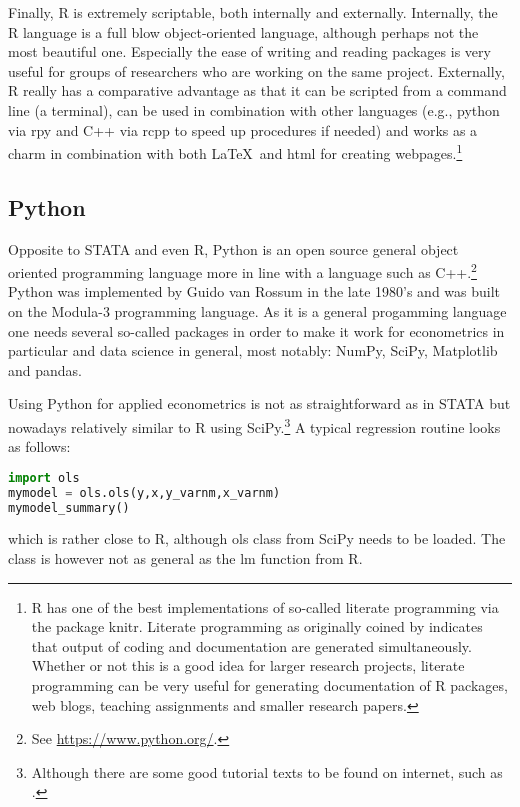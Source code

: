 \documentclass[fleqn,10pt]{SelfArx} %
\begin{document}
Finally, R is extremely scriptable, both internally and externally. Internally, the R language is a full blow object-oriented language, although perhaps not the most beautiful one. Especially the ease of writing and reading packages is very useful for groups of researchers who are working on the same project. Externally, R really has a comparative advantage as that it can be scripted from a command line (a terminal), can be used in combination with other languages (e.g., python via rpy and C++ via rcpp to speed up procedures if needed) and works as a charm in combination with both \LaTeX\ and html for creating webpages.\footnote{R has one of the best implementations of so-called literate programming via the package knitr. Literate programming as originally coined by \citet{knuth1984literate} indicates that output of coding and documentation are generated simultaneously. Whether or not this is a good idea for larger research projects, literate programming can be very useful for generating documentation of R packages, web blogs, teaching assignments and smaller research papers.}

\subsection*{Python}

Opposite to STATA and even R, Python is an open source general object oriented programming language more in line with a language such as C++.\footnote{See \href{https://www.python.org/}{https://www.python.org/}.} Python was implemented by Guido van Rossum in the late 1980's and was built on the Modula-3 programming language. As it is a general progamming language one needs several so-called packages in order to make it work for econometrics in particular and data science in general, most notably: NumPy, SciPy, Matplotlib and pandas.

Using Python for applied econometrics is not as straightforward as in STATA but nowadays relatively similar to R using SciPy.\footnote{Although there are some good tutorial texts to be found on internet, such as \citet{sargent2015quantitative}.} A typical regression routine looks as follows:
\begin{lstlisting}[language=python]
import ols
mymodel = ols.ols(y,x,y_varnm,x_varnm)
mymodel_summary()
\end{lstlisting}
which is rather close to R, although ols class from SciPy needs to be loaded. The class is however not as general as the lm function from R. 
\end{document}

